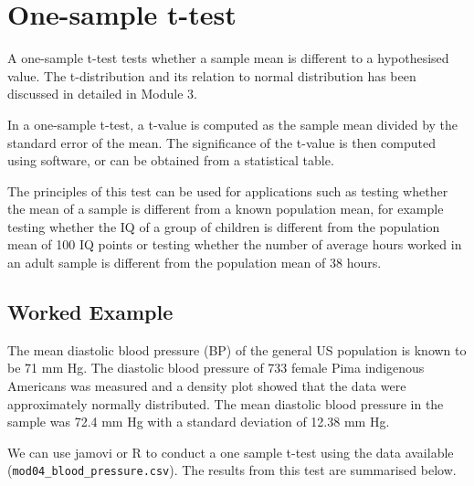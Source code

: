 \documentclass[
  a4paper,
]{memoir}
\begin{document}
\section{One-sample t-test}\label{one-sample-t-test}

A one-sample t-test tests whether a sample mean is different to a
hypothesised value. The t-distribution and its relation to normal
distribution has been discussed in detailed in Module 3.

In a one-sample t-test, a t-value is computed as the sample mean divided
by the standard error of the mean. The significance of the t-value is
then computed using software, or can be obtained from a statistical
table.

The principles of this test can be used for applications such as testing
whether the mean of a sample is different from a known population mean,
for example testing whether the IQ of a group of children is different
from the population mean of 100 IQ points or testing whether the number
of average hours worked in an adult sample is different from the
population mean of 38 hours.

\subsection{Worked Example}\label{worked-example-3}

The mean diastolic blood pressure (BP) of the general US population is
known to be 71 mm Hg. The diastolic blood pressure of 733 female Pima
indigenous Americans was measured and a density plot showed that the
data were approximately normally distributed. The mean diastolic blood
pressure in the sample was 72.4 mm Hg with a standard deviation of 12.38
mm Hg.

We can use jamovi or R to conduct a one sample t-test using the data
available (\texttt{mod04\_blood\_pressure.csv}). The results from this
test are summarised below.
\end{document}
